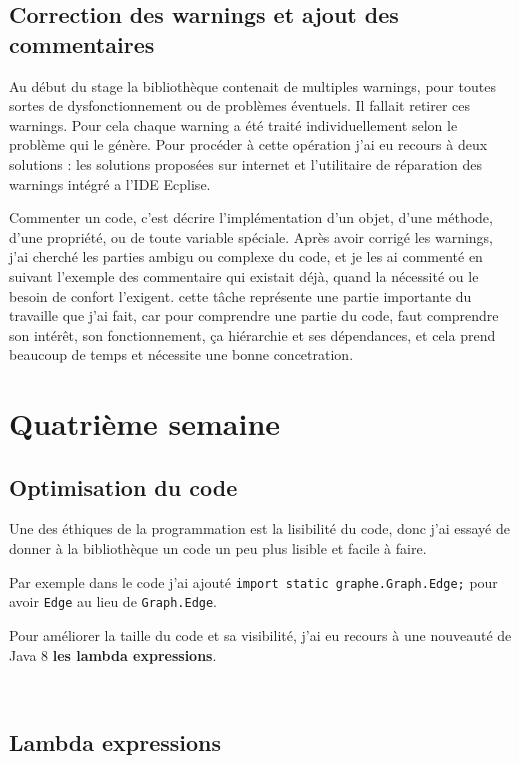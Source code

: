 \documentclass[12pt]{report}
\begin{document}
\subsection{Correction des warnings et  ajout des commentaires}

Au début du stage la bibliothèque contenait de multiples warnings, pour toutes sortes de dysfonctionnement ou de problèmes éventuels. Il fallait retirer ces warnings. Pour cela chaque warning a été traité individuellement selon le problème qui le génère. Pour procéder à cette opération j'ai eu recours à deux solutions : les solutions proposées sur internet et l'utilitaire de réparation des warnings intégré a l'IDE Ecplise.\newline

Commenter un code, c’est décrire l’implémentation d’un objet, d’une méthode, d’une propriété, ou de toute variable spéciale. Après avoir corrigé les  warnings, j'ai cherché les parties ambigu ou complexe du code, et je les ai commenté en suivant l'exemple des commentaire qui existait déjà, quand la nécessité ou le besoin de confort l’exigent. cette tâche représente une partie importante du travaille que j'ai fait, car pour comprendre une partie du code, faut comprendre son intérêt, son fonctionnement, ça hiérarchie et ses dépendances, et cela prend beaucoup de temps et nécessite une bonne concetration.
~\\
\newpage
\section{Quatrième semaine}

\subsection{Optimisation du code}

Une des éthiques de la programmation est la lisibilité du code, donc j'ai essayé de donner à la bibliothèque un code un peu plus lisible et facile à faire. \newline

Par exemple dans le code j'ai ajouté \texttt{import static graphe.Graph.Edge;} pour avoir \texttt{Edge} au lieu de \texttt{Graph.Edge}.\newline

Pour améliorer la taille du code et sa visibilité, j'ai eu recours à une nouveauté de Java 8 \textbf{les lambda expressions}.

~\\
\subsection{Lambda expressions}
\end{document}

